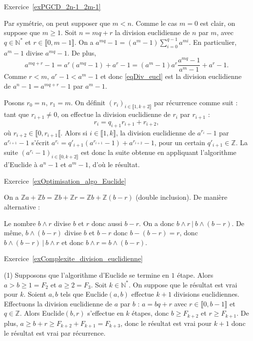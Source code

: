 \documentclass[11pt,a4paper]{article}
\newcommand{\N}{\mathbb{N}}
\newcommand{\Z}{\mathbb{Z}}
\begin{document}
Exercice~\ref{exPGCD_2n-1_2m-1}


Par symétrie, on peut supposer que $m<n$. Comme le cas $m=0$ est clair, on suppose que $m\geq 1$.  Soit $n=mq+r$ la division euclidienne de $n$ par $m$, avec $q\in \N^*$ et $r\in \llbracket 0,m-1\rrbracket$. On a $a^{mq}-1=(a^m-1)\sum_{i=0}^{q-1} a^{mi}$. En particulier, $a^m-1$ divise $a^{mq}-1$. De plus, \begin{equation}\label{eqDiv_eucl}
a^{mq+r}-1=a^r (a^{mq}-1)+a^{r}-1=(a^{m}-1)a^{r}\frac{a^{mq}-1}{a^m-1}+a^{r}-1.
\end{equation}  
Comme $r<m$, $a^r-1<a^m-1$ et donc \eqref{eqDiv_eucl} est la division euclidienne de $a^n-1=a^{mq+r}-1$ par $a^m-1$.

Posons $r_0=n$, $r_1=m$. On définit $(r_i)_{i\in \llbracket 1,k+2\rrbracket}$ par récurrence comme suit : tant que $r_{i+1}\neq 0$, on effectue la division euclidienne de $r_{i}$ par $r_{i+1}$ : \[r_i=q_{i+1} r_{i+1}+ r_{i+2},\] où $r_{i+2}\in \llbracket 0, r_{i+1}\llbracket$. Alors si $i\in \llbracket 1,k\rrbracket$, la division euclidienne de $a^{r_i}-1$ par $a^{r_{i+1}}-1$ s'écrit $a^{r_i}=q'_{i+1} (a^{r_{i+1}}-1)+a^{r_{i+2}}-1$, pour un certain $q'_{i+1}\in \Z$. La suite $(a^{r_i}-1)_{i\in \llbracket 0,k+2\rrbracket}$ est donc la suite obtenue en appliquant l'algorithme d'Euclide à $a^{n}-1$ et $a^m-1$, d'où le résultat.

Exercice~\ref{exOptimisation_algo_Euclide}

On a $\Z a+\Z b =\Z b+\Z r=\Z b+ \Z (b-r)$ (double inclusion). De manière alternative :

Le nombre $b\wedge r$ divise $b$ et $r$ donc aussi $b-r$. On a donc $b\wedge r\  |\  b\wedge (b-r)$. De même, $b\wedge (b-r)$ divise $b$ et $b-r$ donc $b-(b-r)=r$, donc $b\wedge (b-r)\ |\  b\wedge r$ et donc  $b\wedge r=b\wedge (b-r)$.


Exercice~\ref{exComplexite_division_euclidienne}

(1) Supposons que l'algorithme d'Euclide se termine en $1$ étape. Alors $a>b\geq 1=F_2$ et $a\geq 2=F_{3}$. Soit $k\in \N^*$. On suppose que le résultat est vrai pour $k$. Soient $a,b$ tels que Euclide$(a,b)$ effectue $k+1$ divisions euclidiennes. Effectuons la division euclidienne de $a$ par $b$ : $a=bq+r$ avec $r\in \llbracket 0,b-1\rrbracket$ et $q\in \Z$. Alors Euclide$(b,r)$ s'effectue en $k$ étapes, donc $b\geq F_{k+2}$ et $r\geq F_{k+1}$. De plus, $a\geq b+r\geq F_{k+2}+F_{k+1}=F_{k+3}$, donc le résultat est vrai pour $k+1$ donc le résultat est vrai par récurrence.
\end{document}
